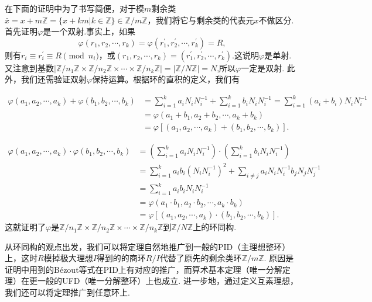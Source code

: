 \documentclass[color=green,mathpazo,titlestyle=hang]{elegantbook}
\begin{document}
  \begin{newproof}
	在下面的证明中为了书写简便，对于模$m$剩余类$\bar{x}=x+m\mathbb{Z}=\{x+km|k\in\mathbb{Z}\}\in \mathbb{Z}/m\mathbb{Z}$，我们将它与剩余类的代表元$x$不做区分. 首先证明$\varphi$是一个双射.事实上，如果
	\[
	\varphi(r_1,r_2,\cdots,r_k)=\varphi(r_1^{'},r_2^{'},\cdots,r_k^{'})=R,
	\]
	则有$r_i\equiv r_i^{'}\equiv R \pmod{n_i} $，或$(r_1,r_2,\cdots,r_k)=(r_1^{'},r_2^{'},\cdots,r_k^{'}).$这说明$\varphi$是单射.
	又注意到基数$\left|\mathbb{Z}/n_1\mathbb{Z}\times\mathbb{Z}/n_2\mathbb{Z}\times\cdots\times\mathbb{Z}/n_k\mathbb{Z}\right|=\left|\mathbb{Z}/N\mathbb{Z}\right|=N$,所以$\varphi$一定是双射.
	此外，我们还需验证双射$\varphi$保持运算。根据环的直积的定义，我们有
	
	\begin{equation*}	
	\begin{aligned}
	\varphi(a_1,a_2,\cdots,a_k)+\varphi(b_1,b_2,\cdots,b_k)	
	&=\sum_{i=1}^{k}a_iN_i N_i^{-1}+\sum_{i=1}^{k}b_iN_i N_i^{-1}=\sum_{i=1}^{k}(a_i+b_i)N_i N_i^{-1}\\
	&=\varphi(a_1+b_1,a_2+b_2,\cdots,a_k+b_k)\\
	&=\varphi[(a_1,a_2,\cdots,a_k)+(b_1,b_2,\cdots,b_k)].
	\end{aligned}		
	\end{equation*}
	
	\begin{equation*}	
	\begin{aligned}
	\varphi(a_1,a_2,\cdots,a_k)\cdot\varphi(b_1,b_2,\cdots,b_k)	
	&=\left(\sum_{i=1}^{k}a_iN_i N_i^{-1}\right)\cdot\left(\sum_{i=1}^{k}b_iN_i N_i^{-1}\right)\\
	&=\sum_{i=1}^{k}a_i b_i (N_i N_i^{-1})^2+\sum_{i\ne j}a_iN_i N_i^{-1}b_jN_j N_j^{-1}\\
	&=\sum_{i=1}^{k}a_i b_i N_i N_i^{-1}\\
	&=\varphi(a_1\cdot b_1,a_2\cdot b_2,\cdots,a_k\cdot b_k)\\
	&=\varphi[(a_1,a_2,\cdots,a_k)\cdot(b_1,b_2,\cdots,b_k)].
	\end{aligned}		
	\end{equation*}  
    这就证明了$\varphi$是$\mathbb{Z}/n_1\mathbb{Z}\times\mathbb{Z}/n_2\mathbb{Z}\times\cdots\times\mathbb{Z}/n_k\mathbb{Z}$到$\mathbb{Z}/N\mathbb{Z}$上的环同构.

  \end{newproof}

  从环同构的观点出发，我们可以将定理自然地推广到一般的PID（主理想整环）上，这时$R$模掉极大理想$I$得到的的商环$R/I$代替了原先的剩余类环$\mathbb{Z}/m\mathbb{Z}$. 原因是证明中用到的B\'{e}zout等式在PID上有对应的推广，而算术基本定理（唯一分解定理）在更一般的UFD（唯一分解整环）上也成立. 进一步地，通过定义互素理想，我们还可以将定理推广到任意环上.
\end{document}

